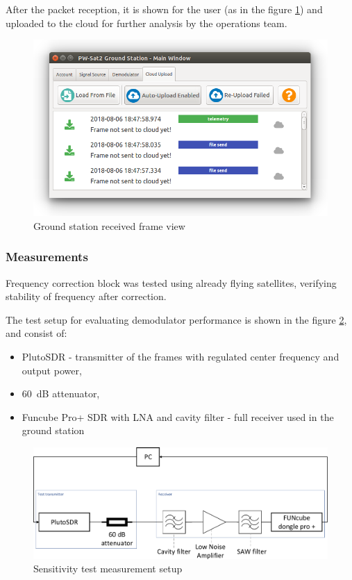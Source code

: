 After the packet reception, it is shown for the user (as in the figure \ref{gs_frame_view}) and uploaded to the cloud for further analysis by the operations team.

\begin{figure}
    \centering
    \includegraphics[width=0.6\paperwidth]{img/5/gs_frame_view.png}
    \caption{Ground station received frame view}
    \label{gs_frame_view}
\end{figure}


\subsubsection{Measurements}
Frequency correction block was tested using already flying satellites, verifying stability of frequency after correction.

The test setup for evaluating demodulator performance is shown in the figure \ref{sensitivity_test_diagram}, and consist of:
\begin{itemize}
    \item PlutoSDR - transmitter of the frames with regulated center frequency and output power,
    \item \SI{60}{\dB} attenuator,
    \item Funcube Pro+ SDR with LNA and cavity filter - full receiver used in the ground station
\end{itemize}

\begin{figure}
    \centering
    \includegraphics[width=0.8\paperwidth]{img/5/sensitivity_test_diagram.pdf}
    \caption{Sensitivity test measurement setup}
    \label{sensitivity_test_diagram}
\end{figure}

